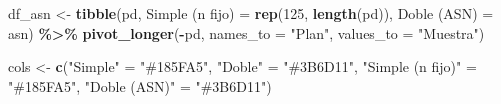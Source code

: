 \documentclass[
  12pt,
]{article}
\newenvironment{Shaded}{\begin{snugshade}}{\end{snugshade}}
\newcommand{\AttributeTok}[1]{\textcolor[rgb]{0.13,0.29,0.53}{#1}}
\newcommand{\DecValTok}[1]{\textcolor[rgb]{0.00,0.00,0.81}{#1}}
\newcommand{\FunctionTok}[1]{\textcolor[rgb]{0.13,0.29,0.53}{\textbf{#1}}}
\newcommand{\NormalTok}[1]{#1}
\newcommand{\OtherTok}[1]{\textcolor[rgb]{0.56,0.35,0.01}{#1}}
\newcommand{\SpecialCharTok}[1]{\textcolor[rgb]{0.81,0.36,0.00}{\textbf{#1}}}
\newcommand{\StringTok}[1]{\textcolor[rgb]{0.31,0.60,0.02}{#1}}
\begin{document}
\begin{Shaded}
\begin{Highlighting}[]
\NormalTok{df\_asn }\OtherTok{\textless{}{-}} \FunctionTok{tibble}\NormalTok{(pd,}
                 \StringTok{\textasciigrave{}}\AttributeTok{Simple (n fijo)}\StringTok{\textasciigrave{}} \OtherTok{=} \FunctionTok{rep}\NormalTok{(}\DecValTok{125}\NormalTok{, }\FunctionTok{length}\NormalTok{(pd)),}
                 \StringTok{\textasciigrave{}}\AttributeTok{Doble (ASN)}\StringTok{\textasciigrave{}}     \OtherTok{=}\NormalTok{ asn) }\SpecialCharTok{\%\textgreater{}\%}
            \FunctionTok{pivot\_longer}\NormalTok{(}\SpecialCharTok{{-}}\NormalTok{pd, }\AttributeTok{names\_to =} \StringTok{"Plan"}\NormalTok{, }\AttributeTok{values\_to =} \StringTok{"Muestra"}\NormalTok{)}

\NormalTok{cols }\OtherTok{\textless{}{-}} \FunctionTok{c}\NormalTok{(}\StringTok{"Simple"} \OtherTok{=} \StringTok{"\#185FA5"}\NormalTok{, }\StringTok{"Doble"} \OtherTok{=} \StringTok{"\#3B6D11"}\NormalTok{,}
          \StringTok{"Simple (n fijo)"} \OtherTok{=} \StringTok{"\#185FA5"}\NormalTok{, }\StringTok{"Doble (ASN)"} \OtherTok{=} \StringTok{"\#3B6D11"}\NormalTok{)}
\end{Highlighting}
\end{Shaded}
\end{document}
